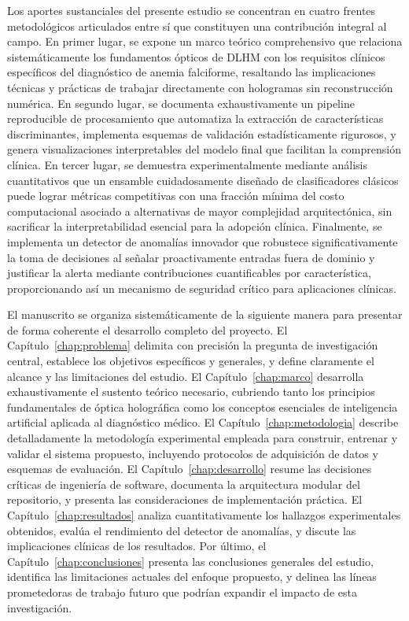 Los aportes sustanciales del presente estudio se concentran en cuatro frentes metodológicos articulados entre sí que constituyen una contribución integral al campo. En primer lugar, se expone un marco teórico comprehensivo que relaciona sistemáticamente los fundamentos ópticos de DLHM con los requisitos clínicos específicos del diagnóstico de anemia falciforme, resaltando las implicaciones técnicas y prácticas de trabajar directamente con hologramas sin reconstrucción numérica. En segundo lugar, se documenta exhaustivamente un pipeline reproducible de procesamiento que automatiza la extracción de características discriminantes, implementa esquemas de validación estadísticamente rigurosos, y genera visualizaciones interpretables del modelo final que facilitan la comprensión clínica. En tercer lugar, se demuestra experimentalmente mediante análisis cuantitativos que un ensamble cuidadosamente diseñado de clasificadores clásicos puede lograr métricas competitivas con una fracción mínima del costo computacional asociado a alternativas de mayor complejidad arquitectónica, sin sacrificar la interpretabilidad esencial para la adopción clínica. Finalmente, se implementa un detector de anomalías innovador que robustece significativamente la toma de decisiones al señalar proactivamente entradas fuera de dominio y justificar la alerta mediante contribuciones cuantificables por característica, proporcionando así un mecanismo de seguridad crítico para aplicaciones clínicas.

El manuscrito se organiza sistemáticamente de la siguiente manera para presentar de forma coherente el desarrollo completo del proyecto. El Capítulo~\ref{chap:problema} delimita con precisión la pregunta de investigación central, establece los objetivos específicos y generales, y define claramente el alcance y las limitaciones del estudio. El Capítulo~\ref{chap:marco} desarrolla exhaustivamente el sustento teórico necesario, cubriendo tanto los principios fundamentales de óptica holográfica como los conceptos esenciales de inteligencia artificial aplicada al diagnóstico médico. El Capítulo~\ref{chap:metodologia} describe detalladamente la metodología experimental empleada para construir, entrenar y validar el sistema propuesto, incluyendo protocolos de adquisición de datos y esquemas de evaluación. El Capítulo~\ref{chap:desarrollo} resume las decisiones críticas de ingeniería de software, documenta la arquitectura modular del repositorio, y presenta las consideraciones de implementación práctica. El Capítulo~\ref{chap:resultados} analiza cuantitativamente los hallazgos experimentales obtenidos, evalúa el rendimiento del detector de anomalías, y discute las implicaciones clínicas de los resultados. Por último, el Capítulo~\ref{chap:conclusiones} presenta las conclusiones generales del estudio, identifica las limitaciones actuales del enfoque propuesto, y delinea las líneas prometedoras de trabajo futuro que podrían expandir el impacto de esta investigación.